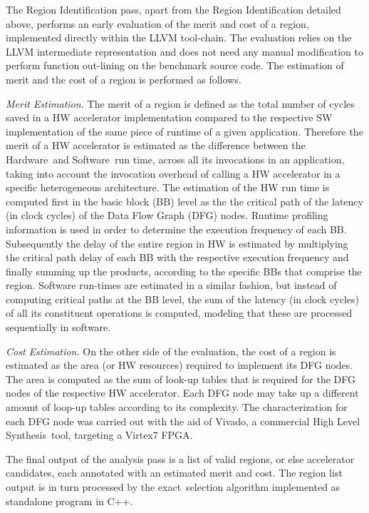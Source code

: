 \documentclass[]{usiinfthesis}
\newcommand{\HW}{{Hardware}}
\newcommand{\SW}{{Software}}
\newcommand{\HLS}{{High Level Synthesis}}
\newcommand{\exact}{\textsf{exact}}
\begin{document}
The Region Identification pass, apart from the Region Identification detailed above, 
performs an early evaluation of the merit and cost of a region, implemented
directly within the LLVM tool-chain. The evaluation relies on the LLVM intermediate
representation and does not need any manual modification to perform function out-lining
on the benchmark source code. 
The estimation of merit and the cost of a region is performed as follows.\par

\emph{Merit Estimation.} 
The merit of a region is defined as the total number of cycles saved in a HW accelerator 
implementation compared to the respective SW implementation of the same piece of runtime 
of a given application. Therefore the merit of a HW accelerator is estimated as the 
difference between the \HW\ and \SW\ run time, across all its invocations in an application,
taking into account the invocation overhead of calling a HW accelerator in a specific 
heterogeneous architecture. The estimation of the HW run time is computed first in the 
basic block (BB) level as the the critical path of the latency (in clock cycles) of the Data 
Flow Graph (DFG) nodes. Runtime profiling information is used in order to determine the execution 
frequency of each BB.
Subsequently the delay of the entire region in HW is estimated by multiplying the critical path
delay of each BB with the respective execution frequency and finally summing up the products, 
according to the specific BBs that comprise the region.
Software run-times are estimated in a similar fashion, but instead of computing critical paths 
at the BB level, the sum of the latency (in clock cycles) of all its constituent operations is 
computed, modeling that these are processed sequentially in software.\par

\emph{Cost Estimation.} On the other side of the evaluation, the cost of a region 
is estimated as the area (or HW resources) required to implement its DFG nodes. The area 
is computed as the sum of look-up tables that is required for
the DFG nodes of the respective HW accelerator. Each DFG node may take up a different amount
of loop-up tables according to its complexity. The characterization for each DFG node was carried
out with the aid of Vivado, a commercial \HLS\ tool, targeting a Virtex7 FPGA.\par
The final output of the analysis pass is a list of valid regions, 
or else accelerator candidates, each annotated with an estimated merit and cost.
The region list output is in turn processed by the 
\exact\ selection algorithm implemented as standalone program in C++.
\end{document}
